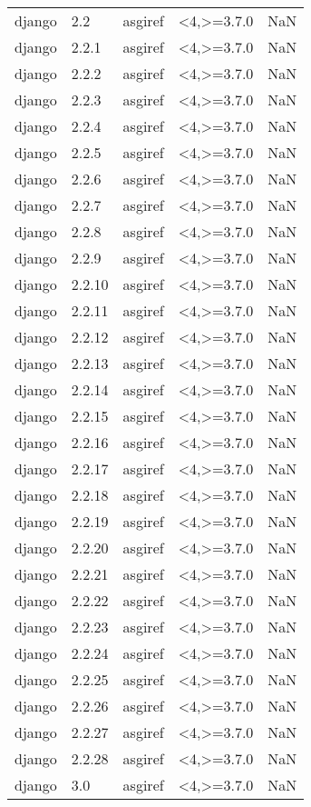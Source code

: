 \begin{tabular}{llllr}
django & 2.2 & asgiref & <4,>=3.7.0 & NaN \\
django & 2.2.1 & asgiref & <4,>=3.7.0 & NaN \\
django & 2.2.2 & asgiref & <4,>=3.7.0 & NaN \\
django & 2.2.3 & asgiref & <4,>=3.7.0 & NaN \\
django & 2.2.4 & asgiref & <4,>=3.7.0 & NaN \\
django & 2.2.5 & asgiref & <4,>=3.7.0 & NaN \\
django & 2.2.6 & asgiref & <4,>=3.7.0 & NaN \\
django & 2.2.7 & asgiref & <4,>=3.7.0 & NaN \\
django & 2.2.8 & asgiref & <4,>=3.7.0 & NaN \\
django & 2.2.9 & asgiref & <4,>=3.7.0 & NaN \\
django & 2.2.10 & asgiref & <4,>=3.7.0 & NaN \\
django & 2.2.11 & asgiref & <4,>=3.7.0 & NaN \\
django & 2.2.12 & asgiref & <4,>=3.7.0 & NaN \\
django & 2.2.13 & asgiref & <4,>=3.7.0 & NaN \\
django & 2.2.14 & asgiref & <4,>=3.7.0 & NaN \\
django & 2.2.15 & asgiref & <4,>=3.7.0 & NaN \\
django & 2.2.16 & asgiref & <4,>=3.7.0 & NaN \\
django & 2.2.17 & asgiref & <4,>=3.7.0 & NaN \\
django & 2.2.18 & asgiref & <4,>=3.7.0 & NaN \\
django & 2.2.19 & asgiref & <4,>=3.7.0 & NaN \\
django & 2.2.20 & asgiref & <4,>=3.7.0 & NaN \\
django & 2.2.21 & asgiref & <4,>=3.7.0 & NaN \\
django & 2.2.22 & asgiref & <4,>=3.7.0 & NaN \\
django & 2.2.23 & asgiref & <4,>=3.7.0 & NaN \\
django & 2.2.24 & asgiref & <4,>=3.7.0 & NaN \\
django & 2.2.25 & asgiref & <4,>=3.7.0 & NaN \\
django & 2.2.26 & asgiref & <4,>=3.7.0 & NaN \\
django & 2.2.27 & asgiref & <4,>=3.7.0 & NaN \\
django & 2.2.28 & asgiref & <4,>=3.7.0 & NaN \\
django & 3.0 & asgiref & <4,>=3.7.0 & NaN \\

\end{tabular}
